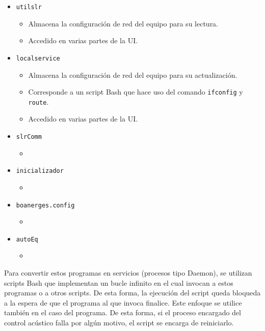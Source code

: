 \begin{itemize}
    \item \verb|utilslr|
    \begin{itemize}
        \item Almacena la configuración de red del equipo para su lectura.
        \item Accedido en varias partes de la UI.
    \end{itemize}

    \item \verb|localservice|
    \begin{itemize}
        \item Almacena la configuración de red del equipo para su actualización.
        \item Corresponde a un script Bash que hace uso del comando \verb|ifconfig| y \verb|route|.
        \item Accedido en varias partes de la UI.
    \end{itemize}

    \item \verb|slrComm|
    \begin{itemize}
        \item
    \end{itemize}

    \item \verb|inicializador|
    \begin{itemize}
        \item
    \end{itemize}

    \item \verb|boanerges.config|
    \begin{itemize}
        \item
    \end{itemize}

    \item \verb|autoEq|
    \begin{itemize}
        \item
    \end{itemize}

\end{itemize}

Para convertir estos programas en servicios (procesos tipo Daemon), se utilizan scripts Bash que implementan un bucle infinito en el cual invocan a estos programas o a otros scripts. De esta forma, la ejecución del script queda bloqueda a la espera de que el programa al que invoca finalice. Este enfoque se utilice también en el caso del programa. De esta forma, si el proceso encargado del control acústico falla por algún motivo, el script se encarga de reiniciarlo.

